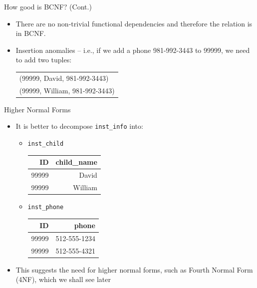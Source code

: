 \documentclass{beamer}
\begin{document}
\begin{frame}{How good is BCNF? (Cont.)}
    \begin{itemize}
        \item There are no non-trivial functional dependencies and therefore the relation is in BCNF.
        \item Insertion anomalies -- i.e., if we add a phone 981-992-3443 to 99999, we need to add two tuples:
            \begin{center}
                \begin{tabular}{l}
                    (99999, David, 981-992-3443) \\
                    (99999, William, 981-992-3443)
                \end{tabular}
            \end{center}
    \end{itemize}
\end{frame}

\begin{frame}{Higher Normal Forms}
    \begin{itemize}
        \item It is better to decompose \texttt{inst\_info} into:
            \begin{itemize}
                \item \texttt{inst\_child}
                    \begin{center}
                        \begin{tabular}{r r}
                            \hline
                            \textbf{ID} & \textbf{child\_name} \\
                            \hline
                            99999 & David   \\
                            99999 & William \\
                            \hline
                        \end{tabular}
                    \end{center}
                \item \texttt{inst\_phone}
                    \begin{center}
                        \begin{tabular}{r r}
                            \hline
                            \textbf{ID} & \textbf{phone} \\
                            \hline
                            99999 & 512-555-1234 \\
                            99999 & 512-555-4321 \\
                            \hline
                        \end{tabular}
                    \end{center}
            \end{itemize}
        \item This suggests the need for higher normal forms, such as Fourth Normal Form (4NF), which we shall see later
    \end{itemize}
\end{frame}
\end{document}
